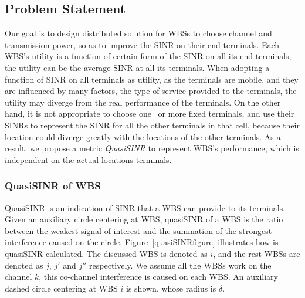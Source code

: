 \subsection{Problem Statement}
Our goal is to design distributed solution for WBSs to choose channel and transmission power, so as to improve the SINR on their end terminals.
Each WBS's utility is a function of certain form of the SINR on all its end terminals, \ie the utility can be the average SINR at all its terminals.
When adopting a function of SINR on all terminals as utility, as the terminals are mobile, and they are influenced by many factors, \ie the type of service provided to the terminals, the utility may diverge from the real performance of the terminals.
On the other hand, it is not appropriate to choose one~\cite{spectrum_sharing_tvspace_2012} or more fixed terminals, and use their SINRs to represent the SINR for all the other terminals in that cell, because their location could diverge greatly with the locations of the other terminals.
As a result, we propose a metric \textit{QuasiSINR} to represent WBS's performance, which is independent on the actual locations terminals.



\subsubsection*{QuasiSINR of WBS}

QuasiSINR is an indication of SINR that a WBS can provide to its terminals.
Given an auxiliary circle centering at WBS, quasiSINR of a WBS is the ratio between the weakest signal of interest and the summation of the strongest interference caused on the circle.
Figure~\ref{quasiSINRfigure} illustrates how is quasiSINR calculated.
%
The discussed WBS is denoted as $i$, and the rest WBSs are denoted as $j$, $j'$ and $j''$ respectively.
We assume all the WBSs work on the channel $k$, this co-channel interference is caused on each WBS.
An auxiliary dashed circle centering at WBS $i$ is shown, whose radius is $\delta$. 



